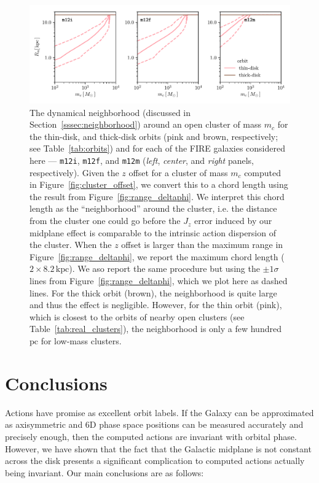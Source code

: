 \documentclass[twocolumn]{aastex62}
\newcommand{\pc}{\text{pc}}
\newcommand{\kpc}{\text{kpc}}
\newcommand{\mi}{\texttt{m12i}}
\newcommand{\mf}{\texttt{m12f}}
\newcommand{\mm}{\texttt{m12m}}
\newcommand{\thincolor}{pink}
\newcommand{\thickcolor}{brown}
\begin{document}
\begin{figure}
\begin{center}
\includegraphics[width=\textwidth]{fig/Rn_vs_mc.pdf}
\end{center}
\caption{The dynamical neighborhood (discussed in
Section~\ref{sssec:neighborhood}) around an open cluster of mass $m_c$ for the
thin-disk, and thick-disk orbits (\thincolor{} and \thickcolor{},
respectively; see Table~\ref{tab:orbits}) and for each of the FIRE galaxies
considered here ---
\mi{}, \mf{}, and \mm{} ({\em left}, {\em center}, and {\em right} panels,
respectively). Given the $z$ offset for a cluster of mass $m_c$ computed in
Figure~\ref{fig:cluster_offset}, we convert this to a chord length using the
result from Figure~\ref{fig:range_deltaphi}. We interpret this chord length as
the ``neighborhood'' around the cluster, i.e. the distance from the cluster
one could go before the $J_z$ error induced by our midplane effect is
comparable to the intrinsic action dispersion of the cluster. When the $z$
offset is larger than the maximum range in Figure~\ref{fig:range_deltaphi}, we
report the maximum chord length ($2\times8.2\,\kpc$). We aso report the same
procedure but using the $\pm1\sigma$ lines from
Figure~\ref{fig:range_deltaphi}, which we plot here as dashed lines. For the
thick orbit (\thickcolor), the neighborhood is quite large and thus the effect
is negligible. However, for the thin orbit (\thincolor), which is closest to
the orbits of nearby open clusters (see Table~\ref{tab:real_clusters}), the
neighborhood is only a few hundred $\pc$ for low-mass clusters.}
\label{fig:Rn_mc}
\end{figure}

\section{Conclusions}\label{sec:conclusion}
Actions have promise as excellent orbit labels. If the Galaxy can be
approximated as axisymmetric and 6D phase space positions can be measured
accurately and precisely enough, then the computed actions are invariant with
orbital phase. However, we have shown that the fact that the Galactic midplane
is not constant across the disk presents a significant complication to
computed actions actually being invariant. Our main conclusions are as
follows:
\end{document}
